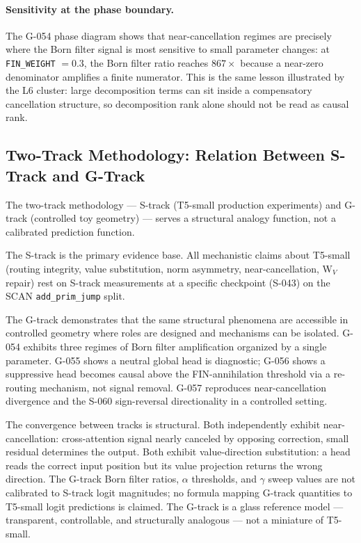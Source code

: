 \paragraph{Sensitivity at the phase boundary.}
The G-054 phase diagram shows that near-cancellation regimes are precisely where the
Born filter signal is most sensitive to small parameter changes: at \texttt{FIN\_WEIGHT}
$=0.3$, the Born filter ratio reaches $867\times$ because a near-zero denominator
amplifies a finite numerator.
This is the same lesson illustrated by the L6 cluster: large decomposition terms can sit
inside a compensatory cancellation structure, so decomposition rank alone should not be
read as causal rank.

\subsection{Two-Track Methodology: Relation Between S-Track and G-Track}

The two-track methodology --- S-track (T5-small production experiments) and G-track
(controlled toy geometry) --- serves a structural analogy function, not a
calibrated prediction function.

The S-track is the primary evidence base.
All mechanistic claims about T5-small (routing integrity, value substitution, norm
asymmetry, near-cancellation, W$_V$ repair) rest on S-track measurements at a specific
checkpoint (S-043) on the SCAN \texttt{add\_prim\_jump} split.

The G-track demonstrates that the same structural phenomena are accessible in controlled
geometry where roles are designed and mechanisms can be isolated.
G-054 exhibits three regimes of Born filter amplification organized by a single
parameter.
G-055 shows a neutral global head is diagnostic; G-056 shows a suppressive head becomes
causal above the FIN-annihilation threshold via a re-routing mechanism, not signal
removal.
G-057 reproduces near-cancellation divergence and the S-060 sign-reversal directionality
in a controlled setting.

The convergence between tracks is structural.
Both independently exhibit near-cancellation: cross-attention signal nearly canceled by
opposing correction, small residual determines the output.
Both exhibit value-direction substitution: a head reads the correct input position but
its value projection returns the wrong direction.
The G-track Born filter ratios, $\alpha$ thresholds, and $\gamma$ sweep values are not
calibrated to S-track logit magnitudes; no formula mapping G-track quantities to
T5-small logit predictions is claimed.
The G-track is a glass reference model --- transparent, controllable, and structurally
analogous --- not a miniature of T5-small.

